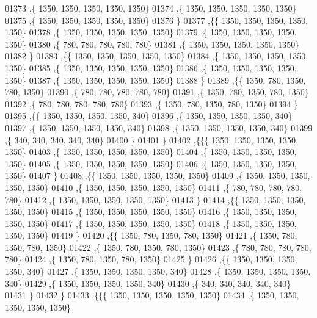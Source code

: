 \begin{DoxyCode}
01373    ,\{  1350,  1350,  1350,  1350,  1350\}
01374    ,\{  1350,  1350,  1350,  1350,  1350\}
01375    ,\{  1350,  1350,  1350,  1350,  1350\}
01376    \}
01377   ,\{\{  1350,  1350,  1350,  1350,  1350\}
01378    ,\{  1350,  1350,  1350,  1350,  1350\}
01379    ,\{  1350,  1350,  1350,  1350,  1350\}
01380    ,\{   780,   780,   780,   780,   780\}
01381    ,\{  1350,  1350,  1350,  1350,  1350\}
01382    \}
01383   ,\{\{  1350,  1350,  1350,  1350,  1350\}
01384    ,\{  1350,  1350,  1350,  1350,  1350\}
01385    ,\{  1350,  1350,  1350,  1350,  1350\}
01386    ,\{  1350,  1350,  1350,  1350,  1350\}
01387    ,\{  1350,  1350,  1350,  1350,  1350\}
01388    \}
01389   ,\{\{  1350,   780,  1350,   780,  1350\}
01390    ,\{   780,   780,   780,   780,   780\}
01391    ,\{  1350,   780,  1350,   780,  1350\}
01392    ,\{   780,   780,   780,   780,   780\}
01393    ,\{  1350,   780,  1350,   780,  1350\}
01394    \}
01395   ,\{\{  1350,  1350,  1350,  1350,   340\}
01396    ,\{  1350,  1350,  1350,  1350,   340\}
01397    ,\{  1350,  1350,  1350,  1350,   340\}
01398    ,\{  1350,  1350,  1350,  1350,   340\}
01399    ,\{   340,   340,   340,   340,   340\}
01400    \}
01401   \}
01402  ,\{\{\{  1350,  1350,  1350,  1350,  1350\}
01403    ,\{  1350,  1350,  1350,  1350,  1350\}
01404    ,\{  1350,  1350,  1350,  1350,  1350\}
01405    ,\{  1350,  1350,  1350,  1350,  1350\}
01406    ,\{  1350,  1350,  1350,  1350,  1350\}
01407    \}
01408   ,\{\{  1350,  1350,  1350,  1350,  1350\}
01409    ,\{  1350,  1350,  1350,  1350,  1350\}
01410    ,\{  1350,  1350,  1350,  1350,  1350\}
01411    ,\{   780,   780,   780,   780,   780\}
01412    ,\{  1350,  1350,  1350,  1350,  1350\}
01413    \}
01414   ,\{\{  1350,  1350,  1350,  1350,  1350\}
01415    ,\{  1350,  1350,  1350,  1350,  1350\}
01416    ,\{  1350,  1350,  1350,  1350,  1350\}
01417    ,\{  1350,  1350,  1350,  1350,  1350\}
01418    ,\{  1350,  1350,  1350,  1350,  1350\}
01419    \}
01420   ,\{\{  1350,   780,  1350,   780,  1350\}
01421    ,\{  1350,   780,  1350,   780,  1350\}
01422    ,\{  1350,   780,  1350,   780,  1350\}
01423    ,\{   780,   780,   780,   780,   780\}
01424    ,\{  1350,   780,  1350,   780,  1350\}
01425    \}
01426   ,\{\{  1350,  1350,  1350,  1350,   340\}
01427    ,\{  1350,  1350,  1350,  1350,   340\}
01428    ,\{  1350,  1350,  1350,  1350,   340\}
01429    ,\{  1350,  1350,  1350,  1350,   340\}
01430    ,\{   340,   340,   340,   340,   340\}
01431    \}
01432   \}
01433  ,\{\{\{  1350,  1350,  1350,  1350,  1350\}
01434    ,\{  1350,  1350,  1350,  1350,  1350\}

\end{DoxyCode}
